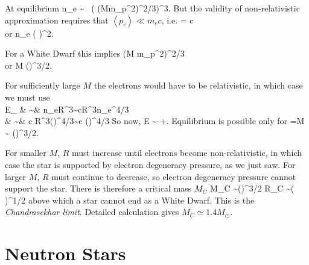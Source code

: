 At equilibrium
\be
n_e \sim {} \
\left( \left(Mm_p^2\right)^{2/3}\right)^3.
\ee
But the validity of non-relativistic approximation requires that
$\left<p_e\right> \ll m_e c$, i.e.
\bea
{} = \ll c \\
\mbox{or} \quad n_e \ll \left( \frac{m_e c}{\hbar} \right)^2.
\eea

For a White Dwarf this implies
\bea
{}\left(M m_p^2\right)^{2/3} \ll {} \\
\mbox{or} \quad M \ll \frac{1}{m_p^2}\left(\frac{\hbar c}{G}\right)^{3/2}.
\eea

For sufficiently large $M$ the electrons would have to be relativistic, in which
case we must use
\bea
{}\\
\Rightarrow \quad E_{} & \sim & 
n_eR^3\sim \hbar cR^3n_e^{4/3} \\
 & \sim & \hbar c R^3\left(\right)^{4/3}\sim \hbar c 
\left(\frac{M}{m_p}\right)^{4/3}\frac{1}{R}
\eea
So now,
\be
E \sim -+.
\ee
Equilibrium is possible only for
\be
\gamma=\alpha \quad \Rightarrow \quad M \sim {}
\left(\right)^{3/2}.
\ee

For smaller $M$, $R$ must increase until electrons become non-relativistic, in
which case the star is supported by electron degeneracy pressure, as we just
saw.  For larger $M$, $R$ must continue to decrease, so electron degeneracy
pressure cannot support the star. There is therefore a critical mass
$M_C$
\be
M_C \sim {}\left(\right)^{3/2} 
\quad \Rightarrow \quad R_C \sim {}\left(
\right)^{1/2}
\ee
above which a star cannot end as a White Dwarf.  This is the 
\emph{Chandrasekhar limit}.  Detailed calculation
gives $M_C\simeq 1.4 M_{\odot}$.

\section{Neutron Stars}

